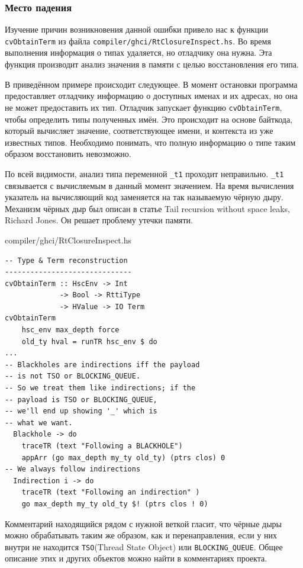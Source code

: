 \documentclass[fontsize=14pt, paper=a4, pagesize, DIV=calc]{scrartcl}
\def\code#1{\texttt{#1}}
\begin{document}
\subsubsection{Место падения}

Изучение причин возникновения данной ошибки привело нас к функции
\code{cvObtainTerm} из файла \code{compiler/ghci/RtClosureInspect.hs}. Во
время выполнения информация о типах удаляется, но отладчику она нужна. Эта
функция производит анализ значения в памяти с целью восстановления его типа.

В приведённом примере происходит следующее. В момент остановки программа
предоставляет отладчику информацию о доступных именах и их адресах, но она не
может предоставить их тип. Отладчик запускает функцию \code{cvObtainTerm},
чтобы определить типы полученных имён. Это происходит на основе байткода,
который вычисляет значение, соответствующее имени, и контекста из уже известных
типов. Необходимо понимать, что полную информацию о типе таким образом
восстановить невозможно.

По всей видимости, анализ типа переменной \code{\_t1} проходит неправильно.
\code{\_t1} связывается с вычисляемым в данный момент значением. На время
вычисления указатель на вычисляющий код заменяется на так называемую чёрную
дыру. Механизм чёрных дыр был описан в статье Tail recursion without space
leaks, Richard Jones\cite{blackholes}. Он решает проблему утечки памяти.

\begin{ListingEnv}
\caption{compiler/ghci/RtClosureInspect.hs}
\begin{lstlisting}[firstnumber=644]
-- Type & Term reconstruction
------------------------------
cvObtainTerm :: HscEnv -> Int 
             -> Bool -> RttiType 
             -> HValue -> IO Term
cvObtainTerm 
    hsc_env max_depth force 
    old_ty hval = runTR hsc_env $ do
...
-- Blackholes are indirections iff the payload 
-- is not TSO or BLOCKING_QUEUE.
-- So we treat them like indirections; if the 
-- payload is TSO or BLOCKING_QUEUE,
-- we'll end up showing '_' which is 
-- what we want.
  Blackhole -> do 
    traceTR (text "Following a BLACKHOLE")
    appArr (go max_depth my_ty old_ty) (ptrs clos) 0
-- We always follow indirections
  Indirection i -> do 
    traceTR (text "Following an indirection" )
    go max_depth my_ty old_ty $! (ptrs clos ! 0)
\end{lstlisting}
\end{ListingEnv}

Комментарий находящийся рядом с нужной веткой гласит, что чёрные дыры можно
обрабатывать таким же образом, как и перенаправления, если у них внутри не
находится \code{TSO}(Thread State Object) или \code{BLOCKING\_QUEUE}. Общее
описание этих и других объектов можно найти в комментариях
проекта\cite{commentary}.
\end{document}
